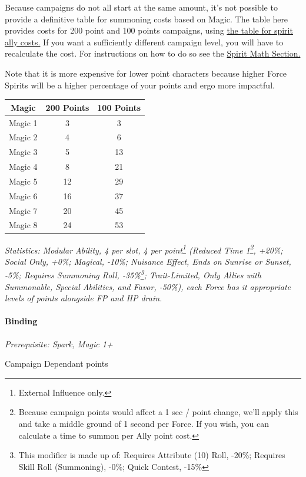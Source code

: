 \begin{multicols*}{3}
	Because campaigns do not all start at the same amount, it's not possible to provide a definitive table for summoning costs based on Magic. The table here provides costs for 200 point and 100 points campaigns, using \hyperref[spirit_ally_cost]{the table for spirit ally costs.} If you want a sufficiently different campaign level, you will have to recalculate the cost. For instructions on how to do so see the \hyperref[spirit_math]{Spirit Math Section.} 
	
	Note that it is more expensive for lower point characters because higher Force Spirits will be a higher percentage of your points and ergo more impactful.
	
	\begin{center}
		\begin{tabular}{|c|c|c|}
			\hline
			Magic & 200 Points & 100 Points \\
			\hline
			\hline
			Magic 1 & 3 & 3 \\
			Magic 2 & 4 & 6 \\
			Magic 3 & 5 & 13 \\
			Magic 4 & 8 & 21 \\
			Magic 5 & 12 & 29 \\
			Magic 6 & 16 & 37 \\
			Magic 7 & 20 & 45 \\
			Magic 8 & 24 & 53 \\
			\hline
		\end{tabular}
	\end{center}
	
	\textit{\textcolor{OliveGreen}{Statistics: Modular Ability, 4 per slot, 4 per point\footnote{External Influence only.} (Reduced Time 1\footnote{Because campaign points would affect a 1 sec / point change, we'll apply this and take a middle ground of 1 second per Force. If you wish, you can calculate a time to summon per Ally point cost.}, +20\%; Social Only, +0\%; Magical, -10\%; Nuisance Effect, Ends on Sunrise or Sunset, -5\%; Requires Summoning Roll, -35\%\footnote{This modifier is made up of: Requires Attribute (10) Roll, -20\%; Requires Skill Roll (Summoning), -0\%; Quick Contest, -15\%}; Trait-Limited, Only Allies with Summonable, Special Abilities, and Favor, -50\%), each Force has it appropriate levels of points alongside FP and HP drain.}}
	
	\paragraph{Binding}\label{binding_spirits}
	\textit{Prerequisite: Spark, Magic 1+}
	\begin{flushright}
		Campaign Dependant points
	\end{flushright}
		

\end{multicols*}

